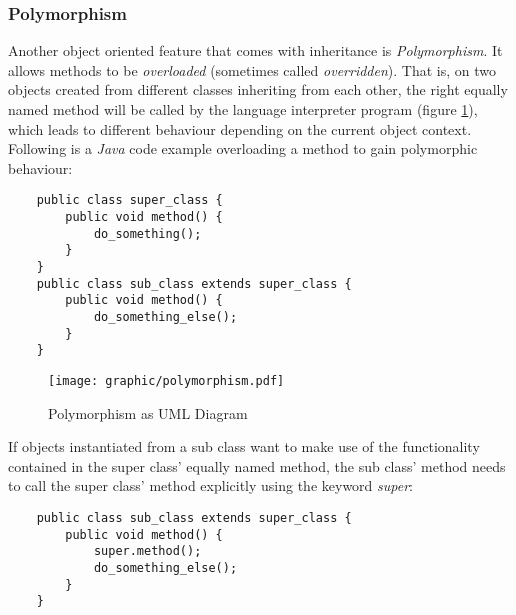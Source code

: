 %
%
%
%
%
%
%

\subsubsection{Polymorphism}
\label{polymorphism_heading}

Another object oriented feature that comes with inheritance is
\emph{Polymorphism}. It allows methods to be \emph{overloaded} (sometimes
called \emph{overridden}). That is, on two objects created from different
classes inheriting from each other, the right equally named method will be
called by the language interpreter program (figure \ref{polymorphism_figure}),
which leads to different behaviour depending on the current object context.
Following is a \emph{Java} code example overloading a method to gain
polymorphic behaviour:

\begin{scriptsize}
    \begin{verbatim}
    public class super_class {
        public void method() {
            do_something();
        }
    }
    public class sub_class extends super_class {
        public void method() {
            do_something_else();
        }
    }
    \end{verbatim}
\end{scriptsize}

\begin{figure}[ht]
    \begin{center}
        \texttt{[image: graphic/polymorphism.pdf]}
        \caption{Polymorphism as UML Diagram}
        \label{polymorphism_figure}
    \end{center}
\end{figure}

If objects instantiated from a sub class want to make use of the functionality
contained in the super class' equally named method, the sub class' method needs
to call the super class' method explicitly using the keyword \emph{super}:

\begin{scriptsize}
    \begin{verbatim}
    public class sub_class extends super_class {
        public void method() {
            super.method();
            do_something_else();
        }
    }
    \end{verbatim}
\end{scriptsize}
